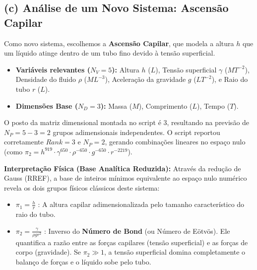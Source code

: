 \documentclass{article}
\begin{document}
\subsection*{(c) Análise de um Novo Sistema: Ascensão Capilar}
Como novo sistema, escolhemos a \textbf{Ascensão Capilar}, que modela a altura $h$ que um líquido atinge dentro de um tubo fino devido à tensão superficial.
\begin{itemize}
    \item \textbf{Variáveis relevantes ($N_V = 5$):} Altura $h$ ($L$), Tensão superficial $\gamma$ ($MT^{-2}$), Densidade do fluido $\rho$ ($ML^{-3}$), Aceleração da gravidade $g$ ($LT^{-2}$), e Raio do tubo $r$ ($L$).
    \item \textbf{Dimensões Base ($N_D = 3$):} Massa ($M$), Comprimento ($L$), Tempo ($T$).
\end{itemize}
O posto da matriz dimensional montada no script é 3, resultando na previsão de $N_P = 5 - 3 = 2$ grupos adimensionais independentes. O script reportou corretamente $Rank = 3$ e $N_P = 2$, gerando combinações lineares no espaço nulo (como $\pi_2 = h^{919} \cdot \gamma^{650} \cdot \rho^{-650} \cdot g^{-650} \cdot r^{-2219}$).

\textbf{Interpretação Física (Base Analítica Reduzida):}
Através da redução de Gauss (RREF), a base de inteiros mínimos equivalente ao espaço nulo numérico revela os dois grupos físicos clássicos deste sistema:
\begin{itemize}
    \item $\pi_1 = \frac{h}{r}$ : A altura capilar adimensionalizada pelo tamanho característico do raio do tubo.
    \item $\pi_2 = \frac{\gamma}{\rho g r^2}$ : Inverso do \textbf{Número de Bond} (ou Número de Eötvös). Ele quantifica a razão entre as forças capilares (tensão superficial) e as forças de corpo (gravidade). Se $\pi_2 \gg 1$, a tensão superficial domina completamente o balanço de forças e o líquido sobe pelo tubo.
\end{itemize}
\end{document}
